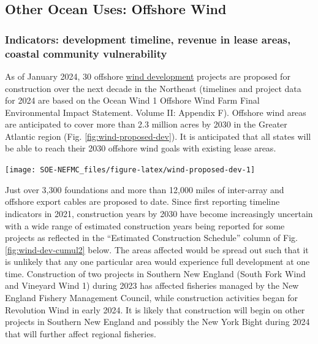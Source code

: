\documentclass[
  10pt,
]{article}
\let\origfigure\figure
\let\endorigfigure\endfigure
\renewenvironment{figure}[1][2] {
    \expandafter\origfigure\expandafter[H]
} {
    \endorigfigure
}
\begin{document}
\hypertarget{other-ocean-uses-offshore-wind}{%
\subsection{Other Ocean Uses: Offshore Wind}\label{other-ocean-uses-offshore-wind}}

\hypertarget{indicators-development-timeline-revenue-in-lease-areas-coastal-community-vulnerability}{%
\subsubsection{Indicators: development timeline, revenue in lease areas, coastal community vulnerability}\label{indicators-development-timeline-revenue-in-lease-areas-coastal-community-vulnerability}}

As of January 2024, 30 offshore \href{https://noaa-edab.github.io/catalog/speed-and-scale-of-offshore-wind-development-in-the-northeast.html}{wind development} projects are proposed for construction over the next decade in the Northeast (timelines and project data for 2024 are based on the Ocean Wind 1 Offshore Wind Farm Final Environmental Impact Statement. Volume II: Appendix F). Offshore wind areas are anticipated to cover more than 2.3 million acres by 2030 in the Greater Atlantic region (Fig. \ref{fig:wind-proposed-dev}). It is anticipated that all states will be able to reach their 2030 offshore wind goals with existing lease areas.

\begin{figure}

{\centering \texttt{[image: SOE-NEFMC\_files/figure-latex/wind-proposed-dev-1]} 

}

\caption{Proposed wind development on the northeast shelf.}\label{fig:wind-proposed-dev}
\end{figure}

Just over 3,300 foundations and more than 12,000 miles of inter-array and offshore export cables are proposed to date. Since first reporting timeline indicators in 2021, construction years by 2030 have become increasingly uncertain with a wide range of estimated construction years being reported for some projects as reflected in the ``Estimated Construction Schedule'' column of Fig. \ref{fig:wind-dev-cumul2} below. The areas affected would be spread out such that it is unlikely that any one particular area would experience full development at one time. Construction of two projects in Southern New England (South Fork Wind and Vineyard Wind 1) during 2023 has affected fisheries managed by the New England Fishery Management Council, while construction activities began for Revolution Wind in early 2024. It is likely that construction will begin on other projects in Southern New England and possibly the New York Bight during 2024 that will further affect regional fisheries.
\end{document}
